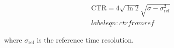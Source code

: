 \begin{align}
\text{CTR} = 4\sqrt{\ln{2}}\sqrt{\sigma-\sigma_\textrm{ref}^2}
\\label{eqn:ctrfromref}
\end{align}

where $\sigma_\text{ref}$ is the reference time resolution.
